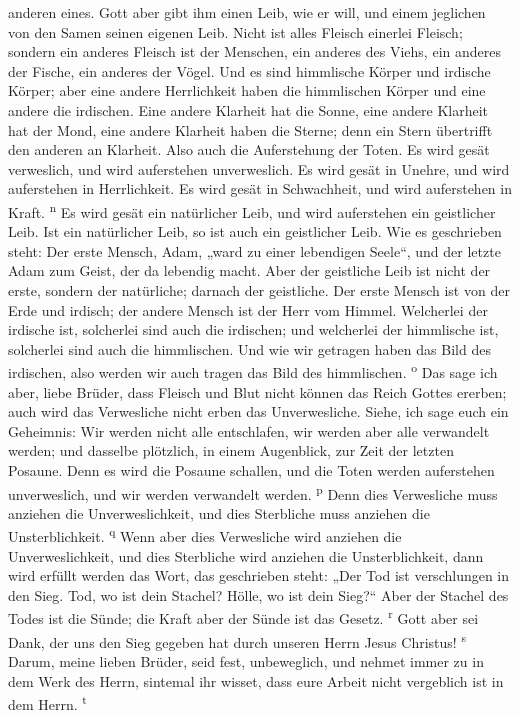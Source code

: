 anderen eines.  Gott aber gibt ihm einen Leib, wie er
will, und einem jeglichen von den Samen seinen eigenen Leib.
 Nicht ist alles Fleisch einerlei Fleisch; sondern ein
anderes Fleisch ist der Menschen, ein anderes des Viehs, ein anderes der
Fische, ein anderes der Vögel.  Und es sind himmlische
Körper und irdische Körper; aber eine andere Herrlichkeit haben die
himmlischen Körper und eine andere die irdischen.  Eine
andere Klarheit hat die Sonne, eine andere Klarheit hat der Mond, eine
andere Klarheit haben die Sterne; denn ein Stern übertrifft den anderen
an Klarheit.  Also auch die Auferstehung der Toten. Es
wird gesät verweslich, und wird auferstehen unverweslich.
 Es wird gesät in Unehre, und wird auferstehen in
Herrlichkeit. Es wird gesät in Schwachheit, und wird auferstehen in
Kraft. \textsuperscript{n}  Es wird gesät ein natürlicher
Leib, und wird auferstehen ein geistlicher Leib. Ist ein natürlicher
Leib, so ist auch ein geistlicher Leib.  Wie es
geschrieben steht: Der erste Mensch, Adam, „ward zu einer lebendigen
Seele``, und der letzte Adam zum Geist, der da lebendig macht.
 Aber der geistliche Leib ist nicht der erste, sondern
der natürliche; darnach der geistliche.  Der erste Mensch
ist von der Erde und irdisch; der andere Mensch ist der Herr vom Himmel.
 Welcherlei der irdische ist, solcherlei sind auch die
irdischen; und welcherlei der himmlische ist, solcherlei sind auch die
himmlischen.  Und wie wir getragen haben das Bild des
irdischen, also werden wir auch tragen das Bild des himmlischen.
\textsuperscript{o}  Das sage ich aber, liebe Brüder,
dass Fleisch und Blut nicht können das Reich Gottes ererben; auch wird
das Verwesliche nicht erben das Unverwesliche.  Siehe,
ich sage euch ein Geheimnis: Wir werden nicht alle entschlafen, wir
werden aber alle verwandelt werden;  und dasselbe
plötzlich, in einem Augenblick, zur Zeit der letzten Posaune. Denn es
wird die Posaune schallen, und die Toten werden auferstehen
unverweslich, und wir werden verwandelt werden. \textsuperscript{p}
 Denn dies Verwesliche muss anziehen die
Unverweslichkeit, und dies Sterbliche muss anziehen die Unsterblichkeit.
\textsuperscript{q}  Wenn aber dies Verwesliche wird
anziehen die Unverweslichkeit, und dies Sterbliche wird anziehen die
Unsterblichkeit, dann wird erfüllt werden das Wort, das geschrieben
steht:  „Der Tod ist verschlungen in den Sieg. Tod, wo
ist dein Stachel? Hölle, wo ist dein Sieg?{}``  Aber der
Stachel des Todes ist die Sünde; die Kraft aber der Sünde ist das
Gesetz. \textsuperscript{r}  Gott aber sei Dank, der uns
den Sieg gegeben hat durch unseren Herrn Jesus Christus!
\textsuperscript{s}  Darum, meine lieben Brüder, seid
fest, unbeweglich, und nehmet immer zu in dem Werk des Herrn, sintemal
ihr wisset, dass eure Arbeit nicht vergeblich ist in dem Herrn.
\textsuperscript{t}

